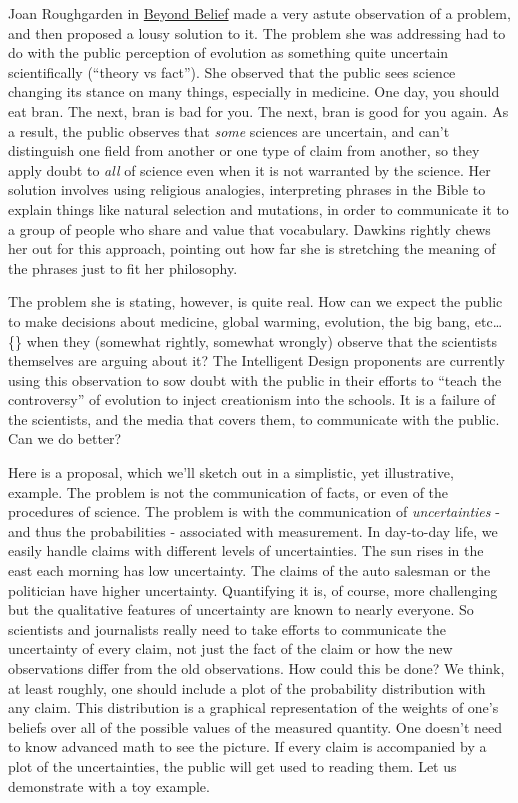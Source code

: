 \documentclass{tufte-book}
\begin{document}
Joan Roughgarden in
\href{http://thesciencenetwork.org/programs/beyond-belief-science-religion-reason-and-survival}{Beyond
Belief} made a very astute observation of a problem, and then proposed a
lousy solution to it. The problem she was addressing had to do with the
public perception of evolution as something quite uncertain
scientifically (``theory vs fact''). She observed that the public sees
science changing its stance on many things, especially in medicine. One
day, you should eat bran. The next, bran is bad for you. The next, bran
is good for you again. As a result, the public observes that \emph{some}
sciences are uncertain, and can't distinguish one field from another or
one type of claim from another, so they apply doubt to \emph{all} of
science even when it is not warranted by the science. Her solution
involves using religious analogies, interpreting phrases in the Bible to
explain things like natural selection and mutations, in order to
communicate it to a group of people who share and value that vocabulary.
Dawkins rightly chews her out for this approach, pointing out how far
she is stretching the meaning of the phrases just to fit her philosophy.

The problem she is stating, however, is quite real. How can we expect
the public to make decisions about medicine, global warming, evolution,
the big bang, etc\ldots\{\} when they (somewhat rightly, somewhat
wrongly) observe that the scientists themselves are arguing about it?
The Intelligent Design proponents are currently using this observation
to sow doubt with the public in their efforts to ``teach the
controversy'' of evolution to inject creationism into the schools. It is
a failure of the scientists, and the media that covers them, to
communicate with the public. Can we do better?

Here is a proposal, which we'll sketch out in a simplistic, yet
illustrative, example. The problem is not the communication of facts, or
even of the procedures of science. The problem is with the communication
of \emph{uncertainties} - and thus the probabilities - associated with
measurement. In day-to-day life, we easily handle claims with different
levels of uncertainties. The sun rises in the east each morning has low
uncertainty. The claims of the auto salesman or the politician have
higher uncertainty. Quantifying it is, of course, more challenging but
the qualitative features of uncertainty are known to nearly everyone. So
scientists and journalists really need to take efforts to communicate
the uncertainty of every claim, not just the fact of the claim or how
the new observations differ from the old observations. How could this be
done? We think, at least roughly, one should include a plot of the
probability distribution with any claim. This distribution is a
graphical representation of the weights of one's beliefs over all of the
possible values of the measured quantity. One doesn't need to know
advanced math to see the picture. If every claim is accompanied by a
plot of the uncertainties, the public will get used to reading them. Let
us demonstrate with a toy example.
\end{document}
